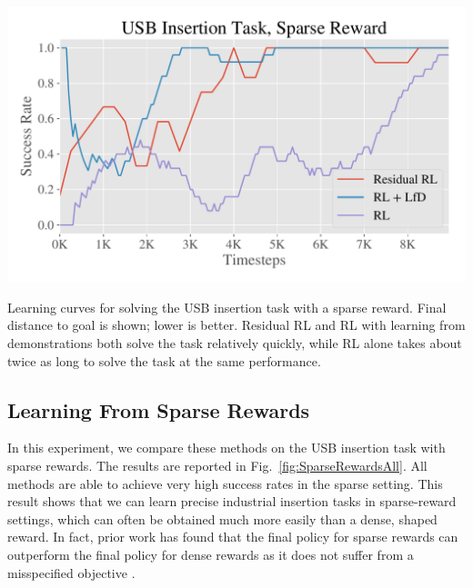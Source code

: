 \begin{table}[ht!]
\begin{minipage}[t]{.47\textwidth}
    \label{tab:goal_pertubation_USB}
    \label{fig:TableUSB}
\end{minipage}
\hfill
\begin{minipage}[t]{.49\textwidth}
\centering
    \includegraphics[width=1\linewidth]{insertion/newfigs/Sparse_success_all.pdf}
    \captionsetup{justification=justified,format=plain}
    \label{fig:SparseRewardsAll}
\end{minipage}
\caption{Learning curves for solving the USB insertion task with a sparse reward. Final distance to goal is shown; lower is better. Residual RL and RL with learning from demonstrations both solve the task relatively quickly, while RL alone takes about twice as long to solve the task at the same performance. }
\end{table}

\subsection{Learning From Sparse Rewards}

In this experiment, we compare these methods on the USB insertion task with sparse rewards. The results are reported in Fig.~\ref{fig:SparseRewardsAll}. All methods are able to achieve very high success rates in the sparse setting. 
This result shows that we can learn precise industrial insertion tasks in sparse-reward settings, which can often be obtained much more easily than a dense, shaped reward. 
In fact, prior work has found that the final policy for sparse rewards can outperform the final policy for dense rewards as it does not suffer from a misspecified objective \cite{andrychowicz2017her}.

